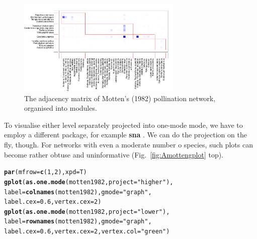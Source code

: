 \documentclass[a4paper, 11pt]{article}\usepackage[]{graphicx}\usepackage[dvipsnames]{xcolor}
\makeatletter
\newcommand{\hlnum}[1]{\textcolor[rgb]{0.686,0.059,0.569}{#1}}%
\newcommand{\hlstr}[1]{\textcolor[rgb]{0.192,0.494,0.8}{#1}}%
\newcommand{\hlstd}[1]{\textcolor[rgb]{0.345,0.345,0.345}{#1}}%
\newcommand{\hlkwc}[1]{\textcolor[rgb]{0.333,0.667,0.333}{#1}}%
\newcommand{\hlkwd}[1]{\textcolor[rgb]{0.737,0.353,0.396}{\textbf{#1}}}%
\newenvironment{kframe}{%
 \def\at@end@of@kframe{}%
 \ifinner\ifhmode%
  \def\at@end@of@kframe{\end{minipage}}%
  \begin{minipage}{\columnwidth}%
 \fi\fi%
 \def\FrameCommand##1{\hskip\@totalleftmargin \hskip-\fboxsep
 \colorbox{shadecolor}{##1}\hskip-\fboxsep
     \hskip-\linewidth \hskip-\@totalleftmargin \hskip\columnwidth}%
 \MakeFramed {\advance\hsize-\width
   \@totalleftmargin\z@ \linewidth\hsize
   \@setminipage}}%
 {\par\unskip\endMakeFramed%
 \at@end@of@kframe}
\newenvironment{knitrout}{}{} %
\newcommand{\package}[1]{\textbf{#1}}
\makeatother
\begin{document}
\begin{figure}%
\centering
	\includegraphics[width=0.7\textwidth]{figures/motten1982_moduleplot}
	\caption{The adjacency matrix of Motten's (1982) pollination network, organised into modules.}
	\label{fig:Amoduleplot}
\end{figure}
%
To visualise either level separately projected into one-mode mode, we have to employ a different package, for example \package{sna} \citep{Butts2013}. We can do the projection on the fly, though. For networks with even a moderate number o species, such plots can become rather obtuse and uninformative (Fig.~\ref{fig:Amottengplot} top).
\begin{knitrout}
\color{fgcolor}\begin{kframe}
\begin{alltt}
\hlkwd{par}\hlstd{(}\hlkwc{mfrow}\hlstd{=}\hlkwd{c}\hlstd{(}\hlnum{1}\hlstd{,}\hlnum{2}\hlstd{),} \hlkwc{xpd}\hlstd{=T)}
\hlkwd{gplot}\hlstd{(}\hlkwd{as.one.mode}\hlstd{(motten1982,} \hlkwc{project}\hlstd{=}\hlstr{"higher"}\hlstd{),}
 \hlkwc{label}\hlstd{=}\hlkwd{colnames}\hlstd{(motten1982),} \hlkwc{gmode}\hlstd{=}\hlstr{"graph"}\hlstd{,}
\hlkwc{label.cex}\hlstd{=}\hlnum{0.6}\hlstd{,} \hlkwc{vertex.cex}\hlstd{=}\hlnum{2}\hlstd{)}
\hlkwd{gplot}\hlstd{(}\hlkwd{as.one.mode}\hlstd{(motten1982,} \hlkwc{project}\hlstd{=}\hlstr{"lower"}\hlstd{),}
        \hlkwc{label}\hlstd{=}\hlkwd{rownames}\hlstd{(motten1982),} \hlkwc{gmode}\hlstd{=}\hlstr{"graph"}\hlstd{,}
        \hlkwc{label.cex}\hlstd{=}\hlnum{0.6}\hlstd{,} \hlkwc{vertex.cex}\hlstd{=}\hlnum{2}\hlstd{,} \hlkwc{vertex.col}\hlstd{=}\hlstr{"green"}\hlstd{)}
\end{alltt}
\end{kframe}
\end{knitrout}
\end{document}
